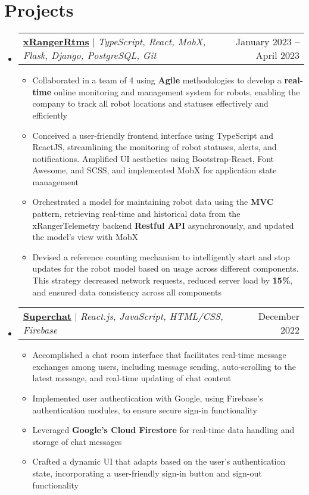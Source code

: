 \documentclass[letterpaper,11pt]{article}
\makeatletter
\newcommand{\resumeItem}[1]{
  \item\small{
    {#1 \vspace{-2pt}}
  }
}
\newcommand{\resumeProjectHeading}[2]{
    \item
    \begin{tabular*}{0.97\textwidth}{l@{\extracolsep{\fill}}r}
      \small#1 & #2 \\
    \end{tabular*}\vspace{-7pt}
}
\newcommand{\resumeSubHeadingListStart}{\begin{itemize}[leftmargin=0.15in, label={}]}
\newcommand{\resumeSubHeadingListEnd}{\end{itemize}}
\newcommand{\resumeItemListStart}{\begin{itemize}}
\newcommand{\resumeItemListEnd}{\end{itemize}\vspace{-5pt}}
\makeatother
\begin{document}
\section{Projects}
    \resumeSubHeadingListStart
      \resumeProjectHeading
          {\textbf{\underline{\href{https://github.com/xRanger-RTMS}{xRangerRtms}}} $|$ \emph{TypeScript, React, MobX, Flask, Django, PostgreSQL, Git}}{January 2023 -- April 2023}
          \resumeItemListStart
            \resumeItem{Collaborated in a team of 4 using \textbf{Agile} methodologies to develop a \textbf{real-time} online monitoring and management system for robots, enabling the company to track all robot locations and statuses effectively and efficiently}
            \resumeItem{Conceived a user-friendly frontend interface using TypeScript and ReactJS, streamlining the monitoring of robot statuses, alerts, and notifications. Amplified UI aesthetics using Bootstrap-React, Font Awesome, and SCSS, and implemented MobX for application state management}
            \resumeItem{Orchestrated a model for maintaining robot data using the \textbf{MVC} pattern, retrieving real-time and historical data from the xRangerTelemetry backend \textbf{Restful API} asynchronously, and updated the model's view with MobX}
            \resumeItem{Devised a reference counting mechanism to intelligently start and stop updates for the robot model based on usage across different components. This strategy decreased network requests, reduced server load by \textbf{15\%}, and ensured data consistency across all components}
          \resumeItemListEnd
      \resumeProjectHeading
          {\textbf{\underline{\href{https://superchat-55fd7.firebaseapp.com/}{Superchat}}} $|$ \emph{React.js, JavaScript, HTML/CSS, Firebase}}{December 2022}
          \resumeItemListStart
            \resumeItem{Accomplished a chat room interface that facilitates real-time message exchanges among users, including message sending, auto-scrolling to the latest message, and real-time updating of chat content}
            \resumeItem{Implemented user authentication with Google, using Firebase’s authentication modules, to ensure secure sign-in functionality}
            \resumeItem{Leveraged \textbf{Google’s Cloud Firestore} for real-time data handling and storage of chat messages}
            \resumeItem{Crafted a dynamic UI that adapts based on the user’s authentication state, incorporating a user-friendly sign-in button and sign-out functionality}
          \resumeItemListEnd
    \resumeSubHeadingListEnd
\end{document}
